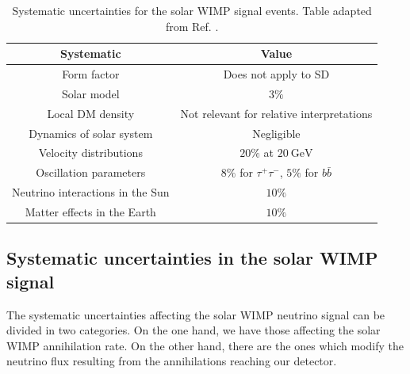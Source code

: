 \begin{table}[t]
	\caption[Systematic uncertainties for the solar WIMP signal events.]{Systematic uncertainties for the solar WIMP signal events. Table adapted from Ref. \cite{Principato2021}.}
	\begin{center}
		\begin{small}
			\begin{tabular}{c|c}
				Systematic                         & Value \\[2mm] \hline
				\rule{0pt}{1.1\normalbaselineskip}Form factor                      & Does not apply to SD \cite{Wikstroem2009} \\[2mm]
				Solar model                      & $3\%$ \cite{Wikstroem2009} \\[2mm]
				Local DM density                 & Not relevant for relative interpretations \cite{Wikstroem2009,Super-Kamiokande2015} \\[2mm]
				Dynamics of solar system         & Negligible \cite{Rott2011} \\[2mm]
				Velocity distributions           & $20\%$ at $20~\mathrm{GeV}$ \cite{Wikstroem2009,Super-Kamiokande2015} \\[2mm] \hline
				\rule{0pt}{1.1\normalbaselineskip}Oscillation parameters           & $8\%$ for $\tau^{+}\tau^{-}$, $5\%$ for $b\bar{b}$ \cite{Boliev2013} \\[2mm]
				Neutrino interactions in the Sun & $10\%$ \\[2mm]
				Matter effects in the Earth      & $10\%$ 
			\end{tabular}
		\end{small}
	\end{center}
	\label{tab:solar_dm_signal_uncertainties}
\end{table}

\subsection{Systematic uncertainties in the solar WIMP signal}

The systematic uncertainties affecting the solar WIMP neutrino signal can be divided in two categories. On the one hand, we have those affecting the solar WIMP annihilation rate. On the other hand, there are the ones which modify the neutrino flux resulting from the annihilations reaching our detector.

